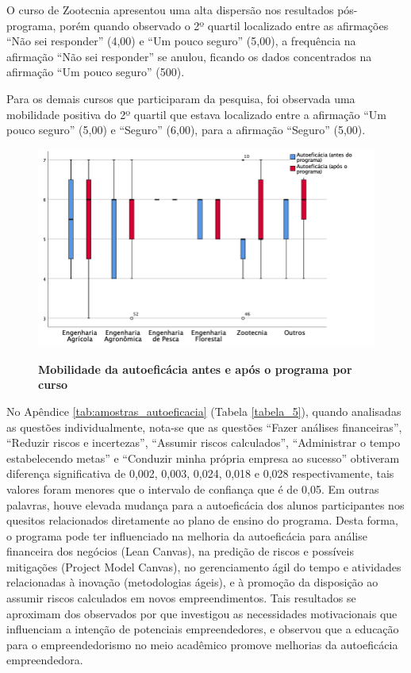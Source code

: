 O curso de Zootecnia apresentou uma alta dispersão nos resultados pós-programa, porém quando observado o 2º quartil localizado entre as afirmações “Não sei responder” (4,00) e “Um pouco seguro” (5,00), a frequência na afirmação “Não sei responder” se anulou, ficando os dados concentrados na afirmação “Um pouco seguro” (500).

Para os demais cursos que participaram da pesquisa, foi observada uma mobilidade positiva do 2º quartil que estava localizado entre a afirmação “Um pouco seguro” (5,00) e “Seguro” (6,00), para a afirmação “Seguro” (5,00).


\begin{figure}[H]
\centering
\caption{\textbf{Mobilidade da autoeficácia antes e após o programa por curso}}
\includegraphics[scale=0.4]{Imagens/boxplot_autoeficacia.png}
\label{figura_34}
\end{figure}


No Apêndice \ref{tab:amostras_autoeficacia} (Tabela \ref{tabela_5}), quando analisadas as questões individualmente, nota-se que as questões “Fazer análises financeiras”, “Reduzir riscos e incertezas”, “Assumir riscos calculados”, “Administrar o tempo estabelecendo metas” e “Conduzir minha própria empresa ao sucesso” obtiveram diferença significativa de 0,002, 0,003, 0,024, 0,018 e 0,028 respectivamente, tais valores foram menores que o intervalo de confiança que é de 0,05. Em outras palavras, houve elevada mudança para a autoeficácia dos alunos participantes nos quesitos relacionados diretamente ao plano de ensino do programa. Desta forma, o programa pode ter influenciado na melhoria da autoeficácia para análise financeira dos negócios (Lean Canvas), na predição de riscos e possíveis mitigações (Project Model Canvas), no gerenciamento ágil do tempo e atividades relacionadas à inovação (metodologias ágeis), e à promoção da disposição ao assumir riscos calculados em novos empreendimentos. Tais resultados se aproximam dos observados por \cite{schaefer_formacao_2017} que investigou as necessidades motivacionais que influenciam a intenção de potenciais empreendedores, e observou que a educação para o empreendedorismo no meio acadêmico promove melhorias da autoeficácia empreendedora.


